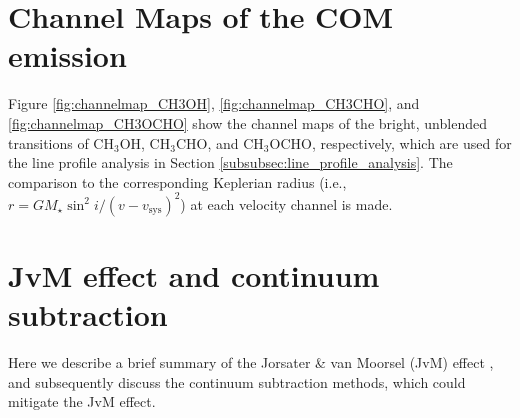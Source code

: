 \documentclass[linenumbers, twocolumn, twocolappendix, astrosymb, times]{aastex631}
\newcommand{\methanol}{CH$_3$OH\xspace}
\newcommand{\acetaldehyde}{CH$_3$CHO\xspace}
\newcommand{\methylformate}{CH$_3$OCHO\xspace}
\begin{document}
\appendix
\section{Channel Maps of the COM emission}\label{appendix:channel_maps}
Figure \ref{fig:channelmap_CH3OH}, \ref{fig:channelmap_CH3CHO}, and \ref{fig:channelmap_CH3OCHO} show the channel maps of the bright, unblended transitions of \methanol, \acetaldehyde, and \methylformate, respectively, which are used for the line profile analysis in Section \ref{subsubsec:line_profile_analysis}. The comparison to the corresponding Keplerian radius (i.e., $r = GM_\star\sin^2 i / (v - v_\mathrm{sys})^2$) at each velocity channel is made.

\begin{figure*}
\caption{Channel maps of the \methanol $2_{-1,1}$ -- $1_{-1,0}$ E $v_t=0$ transition. The black contours mark the [$-$3, 3, 5, 7, ...]$\,\times\,\sigma$ levels. The dashed contours indicate the negative values. The numbers in the upper-right and upper-left corners indicate the velocity of the channel and its corresponding Keplerian radius ($r = GM_\star\sin^2i/(v - v_\mathrm{sys})^2$), respectively. The red cross in each panel indicate the position of the disk center. The beam is shown in the lower-left corner of the lower-left panel.}
\label{fig:channelmap_CH3OH}
\end{figure*}

\begin{figure*}
\caption{Same as Figure \ref{fig:channelmap_CH3OH}, but for \acetaldehyde $5_{2,3}$ -- $4_{2,2}$ E $v_t=0$ transition.}
\label{fig:channelmap_CH3CHO}
\end{figure*}

\begin{figure*}
\caption{Same as Figure \ref{fig:channelmap_CH3OH}, but for \methylformate $8_{5,3}$ -- $7_{5,2}$ A $v_t=0$ transition.}
\label{fig:channelmap_CH3OCHO}
\end{figure*}



\section{JvM effect and continuum subtraction}\label{appendix:JvM_effect}
Here we describe a brief summary of the Jorsater \& van Moorsel (JvM) effect \citep{JvM, Czekala2021}, and subsequently discuss the continuum subtraction methods, which could mitigate the JvM effect.
\end{document}
